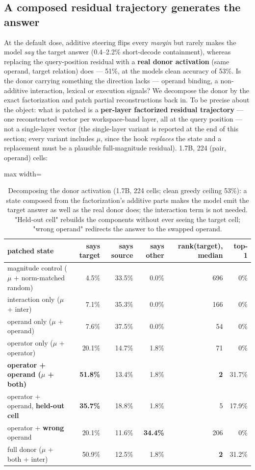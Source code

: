 \subsection{A composed residual trajectory generates the
answer}

At the default dose, additive steering flips every \emph{margin} but
rarely makes the model \emph{say} the target answer (0.4--2.2\%
short-decode containment), whereas replacing the query-position residual
with a \textbf{real donor activation} (same operand, target relation)
does --- 51\%, at the model\textquotesingle s clean accuracy of 53\%. Is
the donor carrying something the direction lacks --- operand binding, a
non-additive interaction, lexical or execution signals? We decompose the
donor by the exact factorization and patch partial reconstructions back
in. To be precise about the object: what is patched is a
\textbf{per-layer factorized residual trajectory} --- one reconstructed
vector per workspace-band layer, all at the query position --- not a
single-layer vector (the single-layer variant is reported at the end of
this section; every variant includes \ensuremath{\mu}, since the hook \emph{replaces}
the state and a replacement must be a plausible full-magnitude
residual). 1.7B, 224 (pair, operand) cells:

{
\begin{table}[t]
\centering\small
\setlength{\tabcolsep}{4pt}
\begin{adjustbox}{max width=\textwidth}
\begin{tabular}{lrrrrr}
\toprule
patched state & says target & says source & says other & rank(target),
median & top-1 \\
\midrule
magnitude control (\ensuremath{\mu} + norm-matched random) & 4.5\% & 33.5\% & 0.0\% &
696 & 0\% \\
interaction only (\ensuremath{\mu} + inter) & 7.1\% & 35.3\% & 0.0\% & 166 & 0\% \\
operand only (\ensuremath{\mu} + operand) & 7.6\% & 37.5\% & 0.0\% & 54 & 0\% \\
operator only (\ensuremath{\mu} + operator) & 20.1\% & 14.7\% & 1.8\% & 71 & 0\% \\
\textbf{operator + operand (\ensuremath{\mu} + both)} & \textbf{51.8\%} & 13.4\% &
1.8\% & \textbf{2} & 31.7\% \\
operator + operand, \textbf{held-out cell} & \textbf{35.7\%} & 18.8\% &
1.8\% & 5 & 17.9\% \\
operator + \textbf{wrong} operand & 20.1\% & 11.6\% & \textbf{34.4\%} &
206 & 0\% \\
full donor (\ensuremath{\mu} + both + inter) & 50.9\% & 12.5\% & 1.8\% & \textbf{2} &
31.2\% \\
\bottomrule
\end{tabular}
\end{adjustbox}
\caption{Decomposing the donor activation (1.7B, 224 cells; clean greedy ceiling 53\%): a state composed from the factorization's additive parts makes the model emit the target answer as well as the real donor does; the interaction term is not needed. "Held-out cell" rebuilds the components without ever seeing the target cell; "wrong operand" redirects the answer to the swapped operand.}
\end{table}
}

